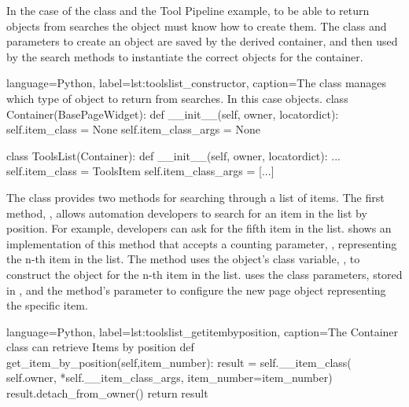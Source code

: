 In the case of the  class and the Tool Pipeline example, to
be able to return  objects from searches the
 object must know how to create them. The 
class and parameters to create an object are saved by the derived container,
and then used by the search methods to instantiate the correct 
objects for the container.

\begin{xcode}{%
  language=Python,%
  label=lst:toolslist_constructor,%
  caption={The  class manages which type of %
            object to return from searches. In this %
           case  objects.}%
}
class Container(BasePageWidget):
    def __init__(self, owner, locatordict):
        self.item_class = None
        self.item_class_args = None

class ToolsList(Container):
    def __init__(self, owner, locatordict):
        ...
        self.item_class = ToolsItem
        self.item_class_args = [{...}]
\end{xcode}



The  class provides two methods for searching through a list
of items.  The first method, , allows
automation developers to search for an item in the list by position. For
example, developers can ask for the fifth item in the list.
 shows an implementation of this method
that accepts a counting parameter, , representing the
n-th item in the list. The method uses the  object's
 class variable, , to construct the
 object for the n-th item in the list.
 uses the  class parameters, stored
in , and the method's
 parameter to configure the new page object
representing the specific item.

\begin{xcode}{%
  language=Python,%
  label=lst:toolslist_getitembyposition,%
  caption={The Container class can retrieve Items by position}%
}
    def get_item_by_position(self,item_number):
        result = self.__item_class(
                  self.owner,
                  *self.__item_class_args,
                  item_number=item_number)
        result.detach_from_owner()
        return result
\end{xcode}

